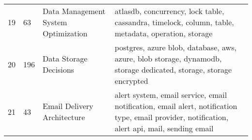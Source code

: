 \begin{longtable}{|p{1cm} p{1.12cm} p{3.3cm} p{9cm}|}
    19 & 63 & Data Management System Optimization & atlasdb, concurrency, lock table, cassandra, timelock, column, table, metadata, operation, storage \\
    
    20 & 196 & Data Storage Decisions & postgres, azure blob, database, aws, azure, blob storage, dynamodb, storage dedicated, storage, storage encrypted \\
    
    21 & 43 & Email Delivery Architecture & alert system, email service, email notification, email alert, notification type, email provider, notification, alert api, mail, sending email \\
    \hline
\end{longtable}
